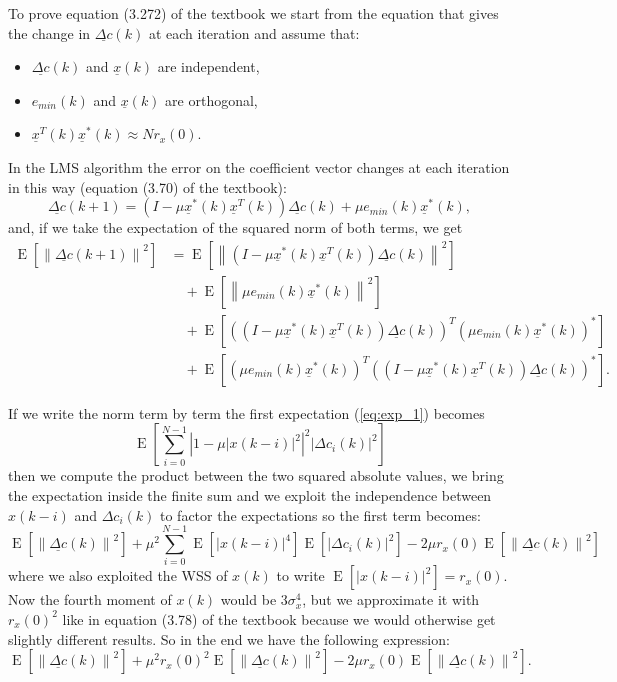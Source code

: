 \documentclass[a4paper,twoside]{article}
\renewcommand{\vec}[1]{\underline{#1}}
\newcommand{\E}[1]{\operatorname{E}\left[#1\right]}
\newcommand{\norm}[1]{\left\lVert#1\right\rVert}
\newcommand{\abs}[1]{\left|#1\right|}
\begin{document}
To prove equation (3.272) of the textbook we start from the equation
that gives the change in $\vec{\Delta c}(k)$ at each iteration and
assume that:
\begin{itemize}
\item $\vec{\Delta c}(k)$ and $\vec{x}(k)$ are independent, 
\item $e_{min}(k)$ and $\vec{x}(k)$ are orthogonal, 
\item $\vec{x}^T(k)\vec{x}^*(k) \approx Nr_x(0)$.
\end{itemize}
In the LMS algorithm the error on the coefficient vector changes at each iteration in this way (equation (3.70) of the textbook):
\begin{equation*}
  \vec{\Delta c}(k+1) = \left( I - \mu\vec{x}^*(k)\vec{x}^T(k) \right) \vec{\Delta c}(k) + \mu e_{min}(k)\vec{x}^*(k) , 
\end{equation*}
and, if we take the expectation of the squared norm of both terms, we get
\begin{align}
  \E{\norm{\vec{\Delta c}(k+1)}^2} %
  &= \E{\norm{\left( I - \mu\vec{x}^*(k)\vec{x}^T(k) \right) \vec{\Delta c}(k)}^2}
  \label{eq:exp_1} \\
  & \quad + \E{\norm{\mu e_{min}(k)\vec{x}^*(k)}^2}
  \label{eq:exp_2} \\
  & \quad + \E{\left(\left( I - \mu\vec{x}^*(k)\vec{x}^T(k) \right)\vec{\Delta c}(k)\right)^T\left(\mu e_{min}(k)\vec{x}^*(k)\right)^*}
  \label{eq:exp_3} \\
  & \quad + \E{\left(\mu e_{min}(k)\vec{x}^*(k)\right)^T\left(\left( I - \mu\vec{x}^*(k) \vec{x}^T(k)\right) \vec{\Delta c}(k)\right)^*}
  \label{eq:exp_4} .
\end{align}

If we write the norm term by term the first expectation
(\ref{eq:exp_1}) becomes
\[ \E{\sum_{i=0}^{N-1}\abs{1 - \mu\abs{x(k-i)}^2}^2\abs{\Delta c_i(k)}^2} \]
then we compute the product between the two squared absolute values,
we bring the expectation inside the finite sum and we exploit the
independence between $x(k-i)$ and $\Delta c_i(k)$ to factor the
expectations so the first term becomes:
\[ \E{\norm{\vec{\Delta c}(k)}^2} +
\mu^2\sum_{i=0}^{N-1}\E{\abs{x(k-i)}^4}\E{\abs{\Delta c_i(k)}^2} - 2\mu
r_x(0)\E{\norm{\vec{\Delta c}(k)}^2}
\]
where we also exploited the WSS of $x(k)$ to write $\E{\abs{x(k-i)}^2}
= r_x(0)$. Now the fourth moment of $x(k)$ would be $3\sigma^4_x$, but
we approximate it with $r_x(0)^2$ like in equation (3.78) of the
textbook because we would otherwise get slightly different results.
So in the end we have the following expression:
\begin{equation}
\E{\norm{\vec{\Delta c}(k)}^2} +
\mu^2r_x(0)^2\E{\norm{\vec{\Delta c}(k)}^2} - 2\mu
r_x(0)\E{\norm{\vec{\Delta c}(k)}^2} .
\label{eq:c_final_1}
\end{equation}
\end{document}

